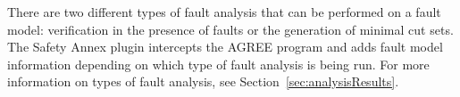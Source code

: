 There are two different types of fault analysis that can be performed on a fault model: verification in the presence of faults or the generation of minimal cut sets. The Safety Annex plugin intercepts the AGREE program and adds fault model information depending on which type of fault analysis is being run. For more information on types of fault analysis, see Section~\ref{sec:analysisResults}.









